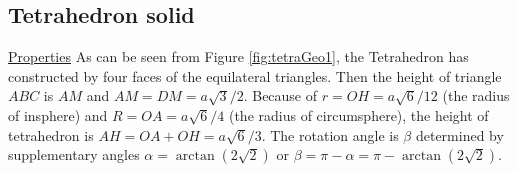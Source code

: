 
%
\clearpage
\newpage
\subsection{Tetrahedron solid}
\noindent\uline{Properties} 
As can be seen from Figure \ref{fig:tetraGeo1}, the Tetrahedron has constructed by four faces of the equilateral triangles. Then the height of triangle $ABC$ is $AM$ and $AM=DM=a\sqrt{3}/2$.
Because of $r=OH=a\sqrt{6}/12$ (the radius of insphere) and $R=OA=a\sqrt{6}/4$ (the radius of circumsphere), the height of tetrahedron is $AH=OA+OH=a\sqrt{6}/3$. The rotation angle is $\beta$ determined by supplementary angles $\alpha=\arctan(2\sqrt{2})$ or $\beta=\pi-\alpha = \pi-\arctan(2\sqrt{2})$.
 
